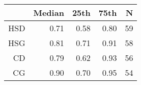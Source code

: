 \begin{tabular}{rrrrr}
\hline
 & Median & 25th & 75th & N \\ 
\hline
HSD & 0.71 & 0.58 & 0.80 & 59 \\ 
HSG & 0.81 & 0.71 & 0.91 & 58 \\ 
CD & 0.79 & 0.62 & 0.93 & 56 \\ 
CG & 0.90 & 0.70 & 0.95 & 54 \\ 
\hline
\end{tabular}%
